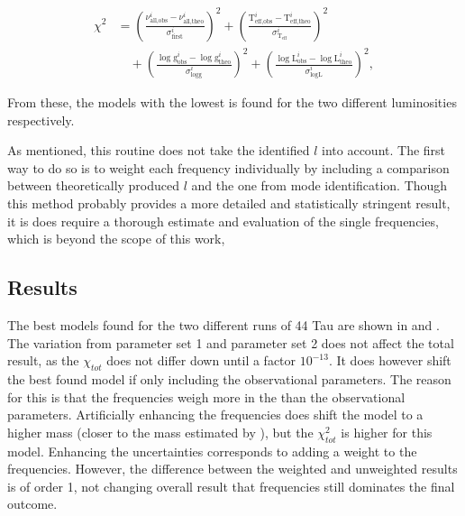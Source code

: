 \begin{align}
\chi^2 &= \left(\frac{\nu_{\text{all,obs}}^i-\nu^i_{\text{all,theo}}}{\sigma^i_{\text{first}}}\right)^2
 +
         \left(\frac{\text{T}_\text{eff,obs}^i-\text{T}_\text{eff,theo}^i}{\sigma^i_{\text{T}_\text{eff}}}\right)^2  \nonumber \\
  & \quad +
\left(\frac{\log \text{g}_\text{obs}^i-\log \text{g}_\text{theo}^i}{\sigma^i_{\log \text{g}}}\right)^2  + \left(\frac{\log \text{L}_\text{obs}^i-\log \text{L}_\text{theo}^i}{\sigma^i_{\log \text{L}}}\right)^2, 
 \label{eq:chis_all}
\end{align}

From these, the models with the lowest \chis is found for the two different luminosities respectively.

As mentioned, this routine does not take the identified $l$ into account. The first way to do so is to weight each frequency individually by including a comparison between theoretically produced $l$ and the one from mode identification. Though this method probably provides a more detailed and statistically stringent result, it is does require a thorough estimate and evaluation of the single frequencies, which is beyond the scope of this work,


\subsection{Results}
The best models found for the two different runs of 44 Tau are shown in  and . The variation from parameter set 1 and parameter set 2 does not affect the total result, as the $\chi_{tot}$ does not differ down until a factor $10^{-13}$. It does however shift the best found model if only including the observational parameters. The reason for this is that the frequencies weigh more in the \chis than the observational parameters. Artificially enhancing the frequencies does shift the model to a higher mass (closer to the mass estimated by \citet{lenz2010delta}), but the $\chi_{ tot}^2$ is higher for this model. Enhancing the uncertainties corresponds to adding a weight to the frequencies. However, the difference between the weighted and unweighted results is of order 1, not changing overall result that frequencies still dominates the final outcome. 

